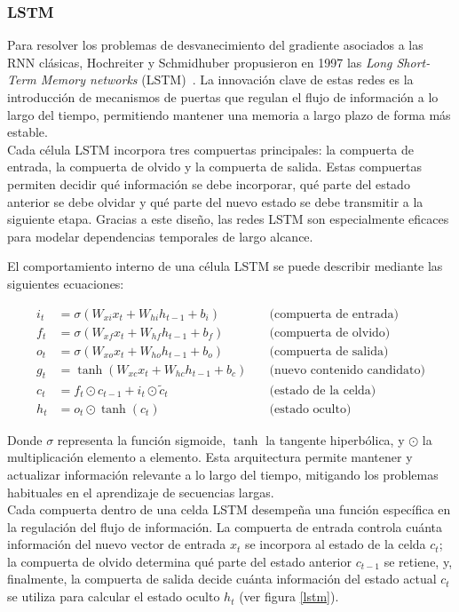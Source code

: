 \subsubsection{LSTM}

Para resolver los problemas de desvanecimiento del gradiente asociados a las RNN clásicas, Hochreiter y Schmidhuber propusieron en 1997 las \textit{Long Short-Term Memory networks} (LSTM)~\cite{10.1162/neco.1997.9.8.1735}. La innovación clave de estas redes es la introducción de mecanismos de puertas que regulan el flujo de información a lo largo del tiempo, permitiendo mantener una memoria a largo plazo de forma más estable.\\

Cada célula LSTM incorpora tres compuertas principales: la compuerta de entrada, la compuerta de olvido y la compuerta de salida. Estas compuertas permiten decidir qué información se debe incorporar, qué parte del estado anterior se debe olvidar y qué parte del nuevo estado se debe transmitir a la siguiente etapa. Gracias a este diseño, las redes LSTM son especialmente eficaces para modelar dependencias temporales de largo alcance.

El comportamiento interno de una célula LSTM se puede describir mediante las siguientes ecuaciones:

\begin{align}
    i_t &= \sigma(W_{xi}x_t + W_{hi}h_{t-1} + b_i) \quad &\text{(compuerta de entrada)} \\
    f_t &= \sigma(W_{xf}x_t + W_{hf}h_{t-1} + b_f) \quad &\text{(compuerta de olvido)} \\
    o_t &= \sigma(W_{xo}x_t + W_{ho}h_{t-1} + b_o) \quad &\text{(compuerta de salida)} \\
    g_t &= \tanh(W_{xc}x_t + W_{hc}h_{t-1} + b_c) \quad &\text{(nuevo contenido candidato)} \\
    c_t &= f_t \odot c_{t-1} + i_t \odot \tilde{c}_t \quad &\text{(estado de la celda)} \\
    h_t &= o_t \odot \tanh(c_t) \quad &\text{(estado oculto)}
\end{align}

Donde $\sigma$ representa la función sigmoide, $\tanh$ la tangente hiperbólica, y $\odot$ la multiplicación elemento a elemento. Esta arquitectura permite mantener y actualizar información relevante a lo largo del tiempo, mitigando los problemas habituales en el aprendizaje de secuencias largas.\\

Cada compuerta dentro de una celda LSTM desempeña una función específica en la regulación del flujo de información. La compuerta de entrada controla cuánta información del nuevo vector de entrada $x_t$ se incorpora al estado de la celda $c_t$; la compuerta de olvido determina qué parte del estado anterior $c_{t-1}$ se retiene, y, finalmente, la compuerta de salida decide cuánta información del estado actual $c_t$ se utiliza para calcular el estado oculto $h_t$ (ver figura \ref{lstm}).

